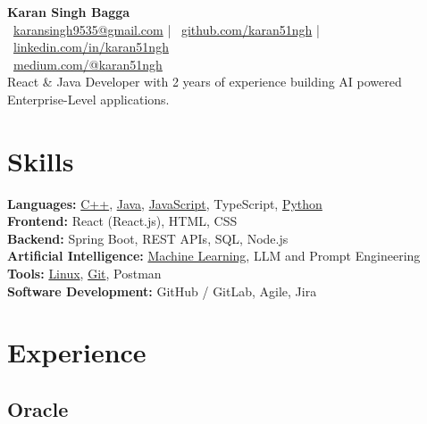\documentclass[a4paper,12pt]{article}
\newcommand{\linuxGitHub}{\href{https://github.com/karan51ngh/karan51ngh}{Linux}}
\newcommand{\gitGitHub}{\href{https://github.com/karan51ngh/gitCheatSheet}{Git}}
\newcommand{\jsGitHub}{\href{https://github.com/karan51ngh?tab=repositories&q=&type=&language=javascript}{JavaScript}}
\newcommand{\cppGitHub}{\href{https://github.com/karan51ngh/topicWiseQuestions}{C++}}
\newcommand{\pythonGitHub}{\href{https://github.com/karan51ngh?tab=repositories&q=&type=&language=python}{Python}}
\newcommand{\MachineLearning}{\href{https://github.com/karan51ngh/machineLearning}{Machine Learning}}
\newcommand{\Java}{\href{https://github.com/karan51ngh/javaprogramming}{Java}}
\begin{document}
\begin{center}
  {\LARGE \textbf{Karan Singh Bagga}} \\
  
  \faEnvelope\ \href{mailto:karansingh9535@gmail.com}{karansingh9535@gmail.com} | 
  \faGithub\ \href{https://github.com/karan51ngh}{github.com/karan51ngh} | 
  \faLinkedin\ \href{https://linkedin.com/in/karan51ngh}{linkedin.com/in/karan51ngh} \\ 
  \faMedium\ \href{https://medium.com/@karan51ngh}{medium.com/@karan51ngh}
  \\
  \vspace{0.4em}
  React \& Java Developer with 2 years of experience building AI powered Enterprise-Level applications.
\end{center}


\section*{\faTools\hspace{0.5em}Skills}
\textbf{Languages:} \cppGitHub, \Java, \jsGitHub, TypeScript, \pythonGitHub \\
\textbf{Frontend:} React (React.js), HTML, CSS \\
\textbf{Backend:} Spring Boot, REST APIs, SQL, Node.js\\
\textbf {Artificial Intelligence:} \MachineLearning, LLM and Prompt Engineering \\
\textbf{Tools:} \linuxGitHub, \gitGitHub, Postman \\
\textbf{Software Development:} GitHub / GitLab, Agile, Jira

\section*{\faBriefcase\hspace{0.5em}Experience}
\subsection*{Oracle }
\end{document}
